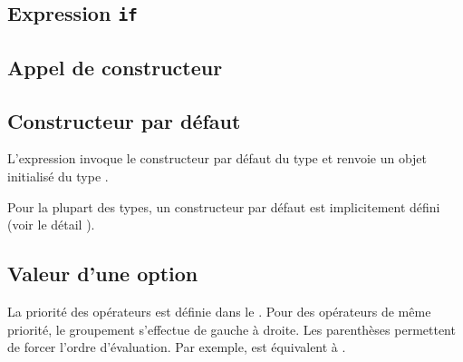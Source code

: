 \subsection{Expression \texttt{if}}




\subsection{Appel de constructeur}



\subsection{Constructeur par défaut}

L'expression \galgas{[@T default]} invoque le constructeur par défaut du type  et renvoie un objet initialisé du type .

Pour la plupart des types, un constructeur par défaut est implicitement défini (voir le détail ).




\subsection{Valeur d'une option}








La priorité des opérateurs est définie dans le . Pour des opérateurs de même priorité, le groupement s'effectue de gauche à droite. Les parenthèses permettent de forcer l'ordre d'évaluation. Par exemple,  est équivalent à .

